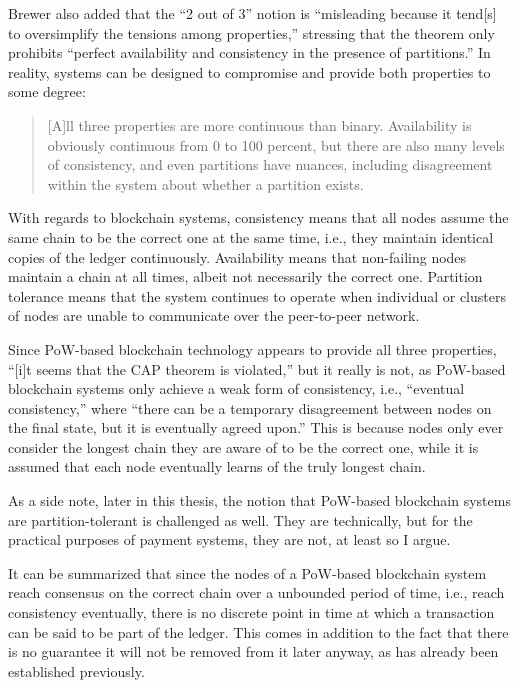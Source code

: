 Brewer also added that the ``2 out of 3'' notion is ``misleading because it tend[s] to oversimplify the tensions among properties,'' stressing that the theorem only prohibits ``perfect availability and consistency in the presence of partitions.'' \autocite{infoq2012caplater}
In reality, systems can be designed to compromise and provide both properties to some degree: \autocite{infoq2012caplater}

\begin{quote}
	[A]ll three properties are more continuous than binary.
	Availability is obviously continuous from 0 to 100 percent, but there are also many levels of consistency, and even partitions have nuances, including disagreement within the system about whether a partition exists.
\end{quote}

With regards to blockchain systems, consistency means that all nodes assume the same chain to be the correct one at the same time, i.e., they maintain identical copies of the ledger continuously.
Availability means that non-failing nodes maintain a chain at all times, albeit not necessarily the correct one.
Partition tolerance means that the system continues to operate when individual or clusters of nodes are unable to communicate over the peer-to-peer network.

Since PoW-based blockchain technology appears to provide all three properties, ``[i]t seems that the CAP theorem is violated,'' but it really is not, as PoW-based blockchain systems only achieve a weak form of consistency, i.e., ``eventual consistency,'' where ``there can be a temporary disagreement between nodes on the final state, but it is eventually agreed upon.'' \autocite[35]{bashir2020}
This is because nodes only ever consider the longest chain they are aware of to be the correct one, while it is assumed that each node eventually learns of the truly longest chain.

As a side note, later in this thesis, the notion that PoW-based blockchain systems are partition-tolerant is challenged as well.
They are technically, but for the practical purposes of payment systems, they are not, at least so I argue.

It can be summarized that since the nodes of a PoW-based blockchain system reach consensus on the correct chain over a unbounded period of time, i.e., reach consistency eventually, there is no discrete point in time at which a transaction can be said to be part of the ledger.
This comes in addition to the fact that there is no guarantee it will not be removed from it later anyway, as has already been established previously.

